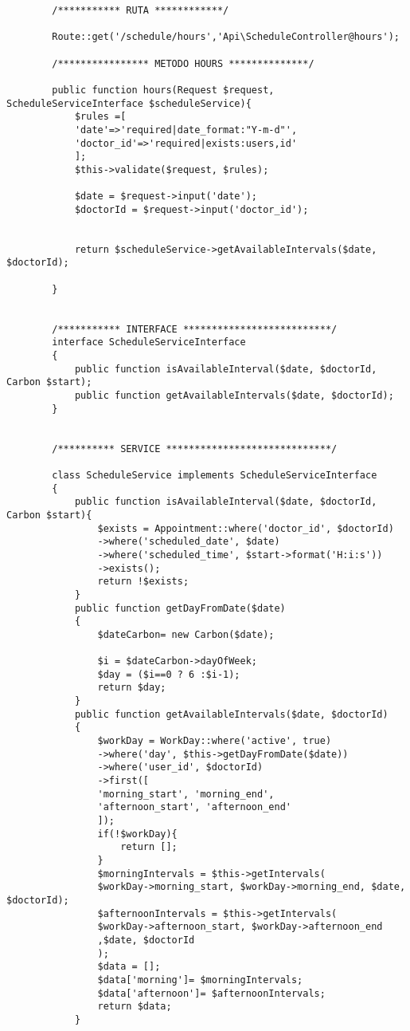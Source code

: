 \documentclass[a4paper]{article}
\begin{document}
	\begin{lstlisting}
		/*********** RUTA ************/
		
		Route::get('/schedule/hours','Api\ScheduleController@hours');
		
		/**************** METODO HOURS **************/
		
		public function hours(Request $request, ScheduleServiceInterface $scheduleService){
			$rules =[
			'date'=>'required|date_format:"Y-m-d"',
			'doctor_id'=>'required|exists:users,id'
			];
			$this->validate($request, $rules);
			
			$date = $request->input('date');
			$doctorId = $request->input('doctor_id');
			
			
			return $scheduleService->getAvailableIntervals($date, $doctorId);
			
		}
	
	
		/*********** INTERFACE **************************/
		interface ScheduleServiceInterface
		{
			public function isAvailableInterval($date, $doctorId, Carbon $start);
			public function getAvailableIntervals($date, $doctorId);
		}
	
	
		/********** SERVICE *****************************/
		
		class ScheduleService implements ScheduleServiceInterface
		{
			public function isAvailableInterval($date, $doctorId, Carbon $start){
				$exists = Appointment::where('doctor_id', $doctorId)
				->where('scheduled_date', $date)
				->where('scheduled_time', $start->format('H:i:s'))
				->exists();
				return !$exists;
			}
			public function getDayFromDate($date)
			{
				$dateCarbon= new Carbon($date);
				
				$i = $dateCarbon->dayOfWeek;
				$day = ($i==0 ? 6 :$i-1);
				return $day;
			}
			public function getAvailableIntervals($date, $doctorId)
			{
				$workDay = WorkDay::where('active', true)
				->where('day', $this->getDayFromDate($date))
				->where('user_id', $doctorId)
				->first([
				'morning_start', 'morning_end',
				'afternoon_start', 'afternoon_end'
				]);
				if(!$workDay){
					return [];
				}
				$morningIntervals = $this->getIntervals(
				$workDay->morning_start, $workDay->morning_end, $date, $doctorId);
				$afternoonIntervals = $this->getIntervals(
				$workDay->afternoon_start, $workDay->afternoon_end
				,$date, $doctorId
				);
				$data = [];
				$data['morning']= $morningIntervals;
				$data['afternoon']= $afternoonIntervals;
				return $data;
			}
			

\end{lstlisting}
\end{document}
